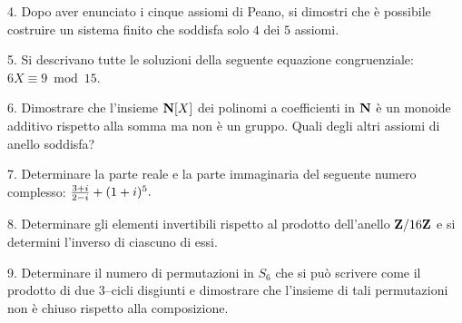 \item{4.} Dopo aver enunciato i cinque assiomi di Peano, si dimostri che \`e possibile costruire
un sistema finito che soddisfa solo $4$ dei $5$ assiomi. 
\ve\vs     %

\item{5.} Si descrivano tutte le soluzioni della seguente equazione congruenziale:
$6X\equiv 9\bmod15$.%
\vv
\item{6.} Dimostrare che l'insieme ${\bf N}[X]$ dei polinomi a coefficienti in ${\bf N}$ \`e un
monoide additivo rispetto alla somma ma non \`e un gruppo. Quali degli altri assiomi di anello soddisfa?
\ve\vs    %
\item{7.} %
Determinare la parte reale e la parte immaginaria del seguente numero complesso:
${3+i\over2-i}+(1+i)^5.$
\ve \vs      %
\item{8.} Determinare gli elementi invertibili rispetto al prodotto dell'anello ${\bf Z}/16{\bf Z}$ e 
si determini l'inverso di ciascuno di essi. %
\vv
\item{9.} Determinare il numero di permutazioni in $S_6$ che si pu\`o scrivere come il prodotto di 
due $3$--cicli disgiunti e dimostrare che l'insieme di tali permutazioni non \`e chiuso rispetto alla composizione.
\bye
